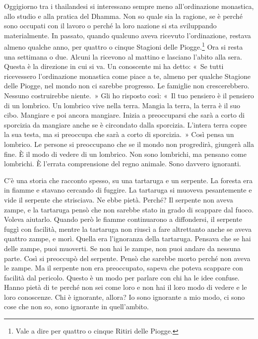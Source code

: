 Oggigiorno tra i thailandesi si interessano sempre meno all'ordinazione
monastica, allo studio e alla pratica del Dhamma. Non so quale sia la
ragione, se è perché sono occupati con il lavoro o perché la loro
nazione si sta sviluppando materialmente. In passato, quando qualcuno
aveva ricevuto l'ordinazione, restava almeno qualche anno, per quattro o
cinque Stagioni delle Piogge.\footnote{Vale a dire per quattro o cinque
  Ritiri delle Piogge.} Ora si resta una
settimana o due. Alcuni la ricevono al mattino e lasciano l'abito alla
sera. Questa è la direzione in cui si va. Un conoscente mi ha detto:
«~Se tutti ricevessero l'ordinazione monastica come piace a te, almeno
per qualche Stagione delle Piogge, nel mondo non ci sarebbe progresso.
Le famiglie non crescerebbero. Nessuno costruirebbe niente.~» Gli ho
risposto così: «~Il tuo pensiero è il pensiero di un lombrico. Un
lombrico vive nella terra. Mangia la terra, la terra è il suo cibo.
Mangiare e poi ancora mangiare. Inizia a preoccuparsi che sarà a corto
di sporcizia da mangiare anche se è circondato dalla sporcizia. L'intera
terra copre la sua testa, ma si preoccupa che sarà a corto di
sporcizia.~» Così pensa un lombrico. Le persone si preoccupano che se il
mondo non progredirà, giungerà alla fine. È il modo di vedere di un
lombrico. Non sono lombrichi, ma pensano come lombrichi. È l'errata
comprensione del regno animale. Sono davvero ignoranti.

C'è una storia che racconto spesso, su una tartaruga e un serpente. La
foresta era in fiamme e stavano cercando di fuggire. La tartaruga si
muoveva pesantemente e vide il serpente che strisciava. Ne ebbe pietà.
Perché? Il serpente non aveva zampe, e la tartaruga pensò che non
sarebbe stato in grado di scappare dal fuoco. Voleva aiutarlo. Quando
però le fiamme continuarono a diffondersi, il serpente fuggì con
facilità, mentre la tartaruga non riuscì a fare altrettanto anche se
aveva quattro zampe, e morì. Quella era l'ignoranza della tartaruga.
Pensava che se hai delle zampe, puoi muoverti. Se non hai le zampe, non
puoi andare da nessuna parte. Così si preoccupò del serpente. Pensò che
sarebbe morto perché non aveva le zampe. Ma il serpente non era
preoccupato, sapeva che poteva scappare con facilità dal pericolo.
Questo è un modo per parlare con chi ha le idee confuse. Hanno pietà di
te perché non sei come loro e non hai il loro modo di vedere e le loro
conoscenze. Chi è ignorante, allora? Io sono ignorante a mio modo, ci
sono cose che non so, sono ignorante in quell'ambito.

